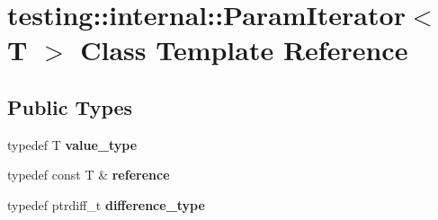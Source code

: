 \hypertarget{classtesting_1_1internal_1_1_param_iterator}{}\section{testing\+:\+:internal\+:\+:Param\+Iterator$<$ T $>$ Class Template Reference}
\label{classtesting_1_1internal_1_1_param_iterator}
\subsection*{Public Types}
\begin{DoxyCompactItemize}
\item 
\mbox{\label{classtesting_1_1internal_1_1_param_iterator_a4afe3a68db0d0744753c8afe262e35df}} 
typedef T {\bfseries value\+\_\+type}
\item 
\mbox{\label{classtesting_1_1internal_1_1_param_iterator_ac96f133ffa06fc0f9faff5a1c7954382}} 
typedef const T \& {\bfseries reference}
\item 
\mbox{\label{classtesting_1_1internal_1_1_param_iterator_a6c37240a04ba3fc4c56f6c413cf4771d}} 
typedef ptrdiff\+\_\+t {\bfseries difference\+\_\+type}
\end{DoxyCompactItemize}
